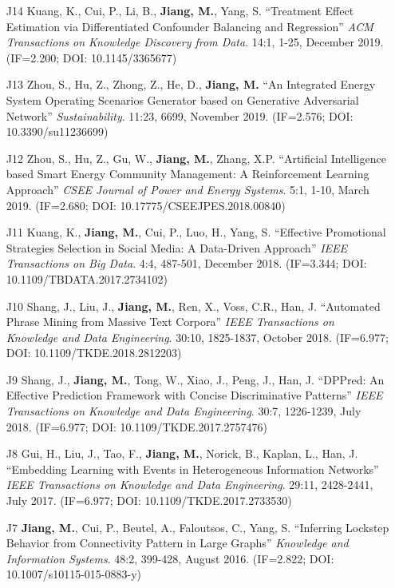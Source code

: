 \documentclass[10pt]{article}
\newenvironment{myindentpar}[1]%
{\begin{list}{}%
         {\setlength{\leftmargin}{#1}}%
         \item[]%
}
{\end{list}}
\newcounter{list}
\begin{document}
\begin{myindentpar}{0.00cm}
\begin{enumerate}[leftmargin=.5cm]
\item[J14] Kuang, K., Cui, P., Li, B., \textbf{Jiang, M.}, Yang, S. ``Treatment Effect Estimation via Differentiated Confounder Balancing and Regression'' \textit{ACM Transactions on Knowledge Discovery from Data}. 14:1, 1-25, December 2019. (IF=2.200; DOI: 10.1145/3365677)
	
\item[J13] Zhou, S., Hu, Z., Zhong, Z., He, D., \textbf{Jiang, M.} ``An Integrated Energy System Operating Scenarios Generator based on Generative Adversarial Network'' \textit{Sustainability}. 11:23, 6699, November 2019. (IF=2.576; DOI: 10.3390/su11236699)

\item[J12] Zhou, S., Hu, Z., Gu, W., \textbf{Jiang, M.}, Zhang, X.P. ``Artificial Intelligence based Smart Energy Community Management: A Reinforcement Learning Approach'' \textit{CSEE Journal of Power and Energy Systems}. 5:1, 1-10, March 2019. (IF=2.680; DOI: 10.17775/CSEEJPES.2018.00840)

\item[J11] Kuang, K., \textbf{Jiang, M.}, Cui, P., Luo, H., Yang, S. ``Effective Promotional Strategies Selection in Social Media: A Data-Driven Approach'' \textit{IEEE Transactions on Big Data}. 4:4, 487-501, December 2018. (IF=3.344; DOI: 10.1109/TBDATA.2017.2734102)

\item[J10] Shang, J., Liu, J., \textbf{Jiang, M.}, Ren, X., Voss, C.R., Han, J. ``Automated Phrase Mining from Massive Text Corpora'' \textit{IEEE Transactions on Knowledge and Data Engineering}. 30:10, 1825-1837, October 2018. (IF=6.977; DOI: 10.1109/TKDE.2018.2812203)

\item[J9] Shang, J., \textbf{Jiang, M.}, Tong, W., Xiao, J., Peng, J., Han, J. ``DPPred: An Effective Prediction Framework with Concise Discriminative Patterns'' \textit{IEEE Transactions on Knowledge and Data Engineering}. 30:7, 1226-1239, July 2018. (IF=6.977; DOI: 10.1109/TKDE.2017.2757476)

\item[J8] Gui, H., Liu, J., Tao, F., \textbf{Jiang, M.}, Norick, B., Kaplan, L., Han, J. ``Embedding Learning with Events in Heterogeneous Information Networks'' \textit{IEEE Transactions on Knowledge and Data Engineering}. 29:11, 2428-2441, July 2017. (IF=6.977; DOI: 10.1109/TKDE.2017.2733530)

\item[J7] \textbf{Jiang, M.}, Cui, P., Beutel, A., Faloutsos, C., Yang, S. ``Inferring Lockstep Behavior from Connectivity Pattern in Large Graphs'' \textit{Knowledge and Information Systems}. 48:2, 399-428, August 2016. (IF=2.822; DOI: 10.1007/s10115-015-0883-y)


\end{enumerate}
\end{myindentpar}
\end{document}
